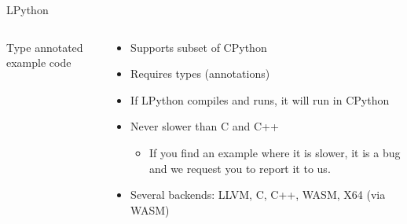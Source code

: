 \begin{frame}{LPython}
    \begin{columns}
        \begin{column}{0.5\textwidth}
            \scriptsize
            
            \centering Type annotated example code
        \end{column}
        \begin{column}{0.5\textwidth}
            \begin{itemize}
                \item Supports subset of CPython
                \item Requires types (annotations)
                \item If LPython compiles and runs, it will run in CPython
                \item Never slower than C and C++
                \begin{itemize}
                    \item \tiny{If you find an example where it is slower, it is a bug and we request you to report it to us.}
                \end{itemize}
                \item Several backends: LLVM, C, C++, WASM, X64 (via WASM)
            \end{itemize}
        \end{column}
    \end{columns}
\end{frame}
